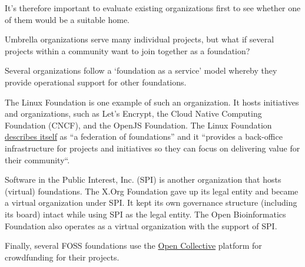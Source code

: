 It's therefore important to evaluate existing organizations first to see whether one of them would be a suitable home.

\begin{kaobox}[frametitle=Foundation as a service]

Umbrella organizations serve many individual projects, but what if several projects within a community want to join together as a foundation?

Several organizations follow a `foundation as a service' model whereby they provide operational support for other foundations.

The Linux Foundation is one example of such an organization.  It hosts initiatives and organizations, such as Let's Encrypt, the Cloud Native Computing Foundation (CNCF), and the OpenJS Foundation.  The Linux Foundation \href{https://www.linuxfoundation.org/join}{describes itself} as ``a federation of foundations'' and it ``provides a back-office infrastructure for projects and initiatives so they can focus on delivering value for their community``.

Software in the Public Interest, Inc. (SPI) is another organization that hosts (virtual) foundations.  The X.Org Foundation gave up its legal entity and became a virtual organization under SPI.  It kept its own governance structure (including its board) intact while using SPI as the legal entity.  The Open Bioinformatics Foundation also operates as a virtual organization with the support of SPI.

Finally, several FOSS foundations use the \href{https://opencollective.com/}{Open Collective} platform for crowdfunding for their projects.

\end{kaobox}

